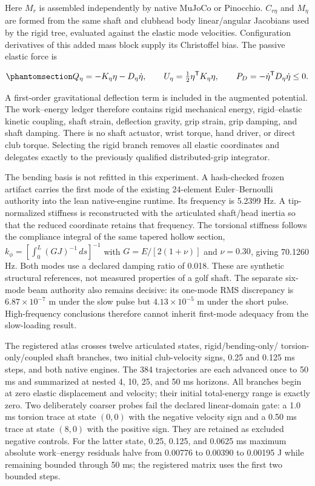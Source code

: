 \documentclass[
  letterpaper,
]{report}
\begin{document}
Here \(M_r\) is assembled independently by native MuJoCo or Pinocchio.
\(C_{r\eta}\) and \(M_\eta\) are formed from the same shaft and clubhead
body linear/angular Jacobians used by the rigid tree, evaluated against
the elastic mode velocities. Configuration derivatives of this added
mass block supply its Christoffel bias. The passive elastic force is

\begin{equation}\phantomsection\label{eq-articulated-shaft-passivity}{
Q_\eta=-K_\eta\eta-D_\eta\dot\eta, \qquad
U_\eta=\tfrac12\eta^\mathsf{T}K_\eta\eta,
\qquad
P_D=-\dot\eta^\mathsf{T}D_\eta\dot\eta\le 0.
}\end{equation}

A first-order gravitational deflection term is included in the augmented
potential. The work--energy ledger therefore contains rigid mechanical
energy, rigid--elastic kinetic coupling, shaft strain, deflection
gravity, grip strain, grip damping, and shaft damping. There is no shaft
actuator, wrist torque, hand driver, or direct club torque. Selecting
the rigid branch removes all elastic coordinates and delegates exactly
to the previously qualified distributed-grip integrator.

The bending basis is not refitted in this experiment. A hash-checked
frozen artifact carries the first mode of the existing 24-element
Euler--Bernoulli authority into the lean native-engine runtime. Its
frequency is 5.2399 Hz. A tip-normalized stiffness is reconstructed with
the articulated shaft/head inertia so that the reduced coordinate
retains that frequency. The torsional stiffness follows the compliance
integral of the same tapered hollow section,
\(k_\phi=[\int_0^L(GJ)^{-1}\,ds]^{-1}\) with \(G=E/[2(1+\nu)]\) and
\(\nu=0.30\), giving 70.1260 Hz. Both modes use a declared damping ratio
of 0.018. These are synthetic structural references, not measured
properties of a golf shaft. The separate six-mode beam authority also
remains decisive: its one-mode RMS discrepancy is \(6.87\times10^{-7}\)
m under the slow pulse but \(4.13\times10^{-5}\) m under the short
pulse. High-frequency conclusions therefore cannot inherit first-mode
adequacy from the slow-loading result.

The registered atlas crosses twelve articulated states,
rigid/bending-only/ torsion-only/coupled shaft branches, two initial
club-velocity signs, 0.25 and 0.125 ms steps, and both native engines.
The 384 trajectories are each advanced once to 50 ms and summarized at
nested 4, 10, 25, and 50 ms horizons. All branches begin at zero elastic
displacement and velocity; their initial total-energy range is exactly
zero. Two deliberately coarser probes fail the declared linear-domain
gate: a 1.0 ms torsion trace at state \((0,0)\) with the negative
velocity sign and a 0.50 ms trace at state \((8,0)\) with the positive
sign. They are retained as excluded negative controls. For the latter
state, 0.25, 0.125, and 0.0625 ms maximum absolute work--energy
residuals halve from 0.00776 to 0.00390 to 0.00195 J while remaining
bounded through 50 ms; the registered matrix uses the first two bounded
steps.
\end{document}
